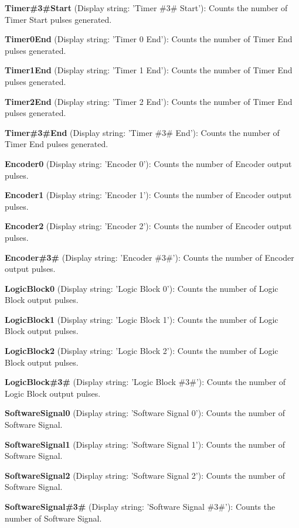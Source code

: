 \begin{DoxyItemize}
\item {\bfseries Timer\#3\#Start} (Display string\+: 'Timer \#3\# Start')\+: Counts the number of Timer Start pulses generated.
\item {\bfseries Timer0\+End} (Display string\+: 'Timer 0 End')\+: Counts the number of Timer End pulses generated.
\item {\bfseries Timer1\+End} (Display string\+: 'Timer 1 End')\+: Counts the number of Timer End pulses generated.
\item {\bfseries Timer2\+End} (Display string\+: 'Timer 2 End')\+: Counts the number of Timer End pulses generated.
\item {\bfseries Timer\#3\#End} (Display string\+: 'Timer \#3\# End')\+: Counts the number of Timer End pulses generated.
\item {\bfseries Encoder0} (Display string\+: 'Encoder 0')\+: Counts the number of Encoder output pulses.
\item {\bfseries Encoder1} (Display string\+: 'Encoder 1')\+: Counts the number of Encoder output pulses.
\item {\bfseries Encoder2} (Display string\+: 'Encoder 2')\+: Counts the number of Encoder output pulses.
\item {\bfseries Encoder\#3\#} (Display string\+: 'Encoder \#3\#')\+: Counts the number of Encoder output pulses.
\item {\bfseries Logic\+Block0} (Display string\+: 'Logic Block 0')\+: Counts the number of Logic Block output pulses.
\item {\bfseries Logic\+Block1} (Display string\+: 'Logic Block 1')\+: Counts the number of Logic Block output pulses.
\item {\bfseries Logic\+Block2} (Display string\+: 'Logic Block 2')\+: Counts the number of Logic Block output pulses.
\item {\bfseries Logic\+Block\#3\#} (Display string\+: 'Logic Block \#3\#')\+: Counts the number of Logic Block output pulses.
\item {\bfseries Software\+Signal0} (Display string\+: 'Software Signal 0')\+: Counts the number of Software Signal.
\item {\bfseries Software\+Signal1} (Display string\+: 'Software Signal 1')\+: Counts the number of Software Signal.
\item {\bfseries Software\+Signal2} (Display string\+: 'Software Signal 2')\+: Counts the number of Software Signal.
\item {\bfseries Software\+Signal\#3\#} (Display string\+: 'Software Signal \#3\#')\+: Counts the number of Software Signal.

\end{DoxyItemize}
